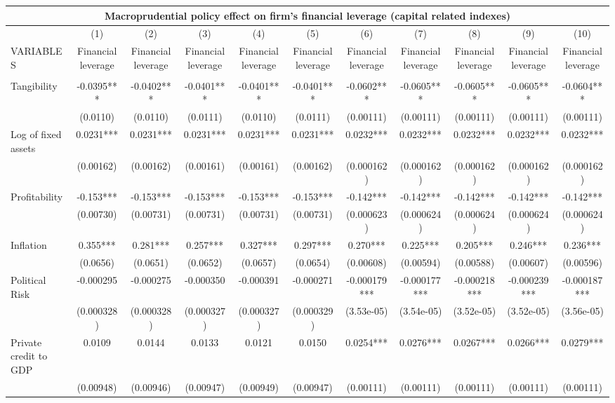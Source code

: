 \begin{tabular}{lcccccccccc}
\multicolumn{11}{c}{Macroprudential policy effect on firm's financial leverage (capital related indexes)} \\ \hline
 & (1) & (2) & (3) & (4) & (5) & (6) & (7) & (8) & (9) & (10) \\
VARIABLES & Financial leverage & Financial leverage & Financial leverage & Financial leverage & Financial leverage & Financial leverage & Financial leverage & Financial leverage & Financial leverage & Financial leverage \\ \hline
 &  &  &  &  &  &  &  &  &  &  \\
Tangibility & -0.0395*** & -0.0402*** & -0.0401*** & -0.0401*** & -0.0401*** & -0.0602*** & -0.0605*** & -0.0605*** & -0.0605*** & -0.0604*** \\
 & (0.0110) & (0.0110) & (0.0111) & (0.0110) & (0.0111) & (0.00111) & (0.00111) & (0.00111) & (0.00111) & (0.00111) \\
Log of fixed assets & 0.0231*** & 0.0231*** & 0.0231*** & 0.0231*** & 0.0231*** & 0.0232*** & 0.0232*** & 0.0232*** & 0.0232*** & 0.0232*** \\
 & (0.00162) & (0.00162) & (0.00161) & (0.00161) & (0.00162) & (0.000162) & (0.000162) & (0.000162) & (0.000162) & (0.000162) \\
Profitability & -0.153*** & -0.153*** & -0.153*** & -0.153*** & -0.153*** & -0.142*** & -0.142*** & -0.142*** & -0.142*** & -0.142*** \\
 & (0.00730) & (0.00731) & (0.00731) & (0.00731) & (0.00731) & (0.000623) & (0.000624) & (0.000624) & (0.000624) & (0.000624) \\
Inflation & 0.355*** & 0.281*** & 0.257*** & 0.327*** & 0.297*** & 0.270*** & 0.225*** & 0.205*** & 0.246*** & 0.236*** \\
 & (0.0656) & (0.0651) & (0.0652) & (0.0657) & (0.0654) & (0.00608) & (0.00594) & (0.00588) & (0.00607) & (0.00596) \\
Political Risk & -0.000295 & -0.000275 & -0.000350 & -0.000391 & -0.000271 & -0.000179*** & -0.000177*** & -0.000218*** & -0.000239*** & -0.000187*** \\
 & (0.000328) & (0.000328) & (0.000327) & (0.000327) & (0.000329) & (3.53e-05) & (3.54e-05) & (3.52e-05) & (3.52e-05) & (3.56e-05) \\
Private credit to GDP & 0.0109 & 0.0144 & 0.0133 & 0.0121 & 0.0150 & 0.0254*** & 0.0276*** & 0.0267*** & 0.0266*** & 0.0279*** \\
 & (0.00948) & (0.00946) & (0.00947) & (0.00949) & (0.00947) & (0.00111) & (0.00111) & (0.00111) & (0.00111) & (0.00111) \\

\end{tabular}
